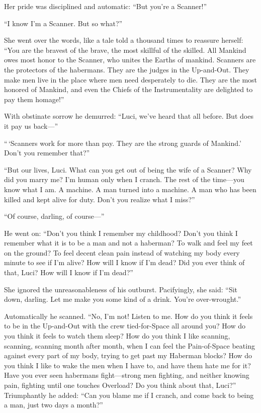 Her pride was disciplined and automatic: ``But you're a Scanner!''

``I know I'm a Scanner. But so what?''

She went over the words, like a tale told a thousand times to reassure herself: ``You are the bravest of the brave, the most skillful of the skilled. All Mankind owes most honor to the Scanner, who unites the Earths of mankind. Scanners are the protectors of the habermans. They are the judges in the Up-and-Out. They make men live in the place where men need desperately to die. They are the most honored of Mankind, and even the Chiefs of the Instrumentality are delighted to pay them homage!''

With obstinate sorrow he demurred: ``Luci, we've heard that all before. But does it pay us back---''

``\,`Scanners work for more than pay. They are the strong guards of Mankind.' Don't you remember that?''

``But our lives, Luci. What can you get out of being the wife of a Scanner? Why did you marry me? I'm human only when I cranch. The rest of the time---you know what I am. A machine. A man turned into a machine. A man who has been killed and kept alive for duty. Don't you realize what I miss?''

``Of course, darling, of course---''

He went on: ``Don't you think I remember my childhood? Don't you think I remember what it is to be a man and not a haberman? To walk and feel my feet on the ground? To feel decent clean pain instead of watching my body every minute to see if I'm alive? How will I know if I'm dead? Did you ever think of that, Luci? How will I know if I'm dead?''

She ignored the unreasonableness of his outburst. Pacifyingly, she said: ``Sit down, darling. Let me make you some kind of a drink. You're over-wrought.''

Automatically he scanned. ``No, I'm not! Listen to me. How do you think it feels to be in the Up-and-Out with the crew tied-for-Space all around you? How do you think it feels to watch them sleep? How do you think I like scanning, scanning, scanning month after month, when I can feel the Pain-of-Space beating against every part of my body, trying to get past my Haberman blocks? How do you think I like to wake the men when I have to, and have them hate me for it? Have you ever seen habermans fight---strong men fighting, and neither knowing pain, fighting until one touches Overload? Do you think about that, Luci?'' Triumphantly he added: ``Can you blame me if I cranch, and come back to being a man, just two days a month?''


